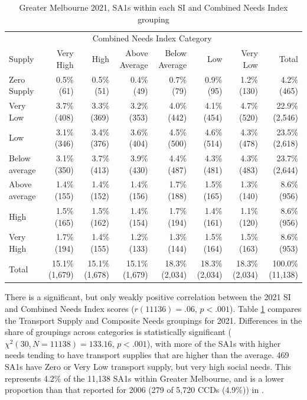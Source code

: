 \documentclass[preprint, 3p,
authoryear]{elsarticle} %
\begin{document}
\begin{table}

\caption{\label{tab:Greater_Melbourne_2021_needs_gap_zones}Greater Melbourne 2021, SA1s within each SI and Combined Needs Index grouping}
\centering
\fontsize{7}{9}\selectfont
\begin{tabular}[t]{l|r|r|r|r|r|r|r}
\hline
\multicolumn{1}{c|}{ } & \multicolumn{6}{c|}{Combined Needs Index Category} & \multicolumn{1}{c}{ } \\
\cline{2-7}
Supply & Very High & High & Above Average & Below Average & Low & Very Low & Total\\
\hline
Zero Supply & 0.5\%    (61) & 0.5\%    (51) & 0.4\%    (49) & 0.7\%    (79) & 0.9\%    (95) & 1.2\%   (130) & 4.2\%    (465)\\
\hline
Very Low & 3.7\%   (408) & 3.3\%   (369) & 3.2\%   (353) & 4.0\%   (442) & 4.1\%   (454) & 4.7\%   (520) & 22.9\%  (2,546)\\
\hline
Low & 3.1\%   (346) & 3.4\%   (376) & 3.6\%   (404) & 4.5\%   (500) & 4.6\%   (514) & 4.3\%   (478) & 23.5\%  (2,618)\\
\hline
Below average & 3.1\%   (350) & 3.7\%   (413) & 3.9\%   (430) & 4.4\%   (487) & 4.3\%   (481) & 4.3\%   (483) & 23.7\%  (2,644)\\
\hline
Above average & 1.4\%   (155) & 1.4\%   (152) & 1.4\%   (156) & 1.7\%   (188) & 1.5\%   (165) & 1.3\%   (140) & 8.6\%    (956)\\
\hline
High & 1.5\%   (165) & 1.5\%   (162) & 1.4\%   (154) & 1.7\%   (194) & 1.4\%   (161) & 1.1\%   (120) & 8.6\%    (956)\\
\hline
Very High & 1.7\%   (194) & 1.4\%   (155) & 1.2\%   (133) & 1.3\%   (144) & 1.5\%   (164) & 1.5\%   (163) & 8.6\%    (953)\\
\hline
Total & 15.1\% (1,679) & 15.1\% (1,678) & 15.1\% (1,679) & 18.3\% (2,034) & 18.3\% (2,034) & 18.3\% (2,034) & 100.0\% (11,138)\\
\hline
\end{tabular}
\end{table}

There is a significant, but only weakly positive correlation between the
2021 SI and Combined Needs Index scores (\(r(11136) = .06\),
\(p < .001\)). Table \ref{tab:Greater_Melbourne_2021_needs_gap_zones}
compares the Transport Supply and Composite Needs groupings for 2021.
Differences in the share of groupings across categories is statistically
significant (\(\chi^2(30, N = 11138) = 133.16\), \(p < .001\)), with
more of the SA1s with higher needs tending to have transport supplies
that are higher than the average. 469 SA1s have Zero or Very Low
transport supply, but very high social needs. This represents 4.2\% of
the 11,138 SA1s within Greater Melbourne, and is a lower proportion than
that reported for 2006 (279 of 5,720 CCDs (4.9\%)) in
\citet{currie2010identifying}.
\end{document}
